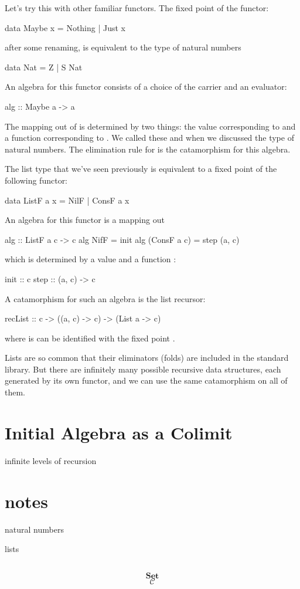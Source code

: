 \documentclass[DaoFP]{subfiles}
\begin{document}
Let's try this with other familiar functors. The fixed point of the  functor:
\begin{haskell}
data Maybe x = Nothing | Just x
\end{haskell}
after some renaming, is equivalent to the type of natural numbers
\begin{haskell}
data Nat = Z | S Nat
\end{haskell}
An algebra for this functor consists of a choice of the carrier  and an evaluator:
\begin{haskell}
alg :: Maybe a -> a
\end{haskell}
The mapping out of  is determined by two things: the value corresponding to  and a function  corresponding to . We called these  and  when we discussed the type of natural numbers. The elimination rule for  is the catamorphism for this algebra.

The list type that we've seen previously is equivalent to a fixed point of the following functor:
\begin{haskell}
data ListF a x = NilF | ConsF a x
\end{haskell}
An algebra for this functor is a mapping out 
\begin{haskell}
alg :: ListF a c -> c
alg NifF = init
alg (ConsF a c) = step (a, c)
\end{haskell}
which is determined by a value  and a function :
\begin{haskell}
init :: c
step :: (a, c) -> c
\end{haskell}
A catamorphism for such an algebra is the list recursor:
\begin{haskell}
recList :: c -> ((a, c) -> c) -> (List a -> c)
\end{haskell}
where  is can be identified with the fixed point .

Lists are so common that their eliminators (folds) are included in the standard library. But there are infinitely many possible recursive data structures, each generated by its own functor, and we can use the same catamorphism on all of them.

\section{Initial Algebra as a Colimit}

infinite levels of recursion

\section{notes}

natural numbers

lists

\begin{exercise}
\end{exercise}

\begin{haskell}
\end{haskell}

\[
 \begin{tikzcd}
  \end{tikzcd}
\]

\[   \mathbf{Set} \]
\[   \mathcal{C} \]
\end{document}
